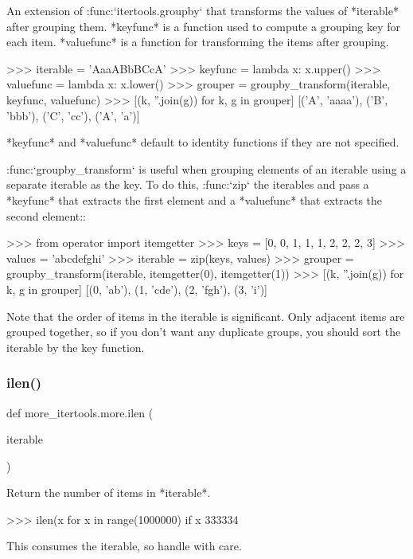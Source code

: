 \begin{DoxyVerb}An extension of :func:`itertools.groupby` that transforms the values of
*iterable* after grouping them.
*keyfunc* is a function used to compute a grouping key for each item.
*valuefunc* is a function for transforming the items after grouping.

    >>> iterable = 'AaaABbBCcA'
    >>> keyfunc = lambda x: x.upper()
    >>> valuefunc = lambda x: x.lower()
    >>> grouper = groupby_transform(iterable, keyfunc, valuefunc)
    >>> [(k, ''.join(g)) for k, g in grouper]
    [('A', 'aaaa'), ('B', 'bbb'), ('C', 'cc'), ('A', 'a')]

*keyfunc* and *valuefunc* default to identity functions if they are not
specified.

:func:`groupby_transform` is useful when grouping elements of an iterable
using a separate iterable as the key. To do this, :func:`zip` the iterables
and pass a *keyfunc* that extracts the first element and a *valuefunc*
that extracts the second element::

    >>> from operator import itemgetter
    >>> keys = [0, 0, 1, 1, 1, 2, 2, 2, 3]
    >>> values = 'abcdefghi'
    >>> iterable = zip(keys, values)
    >>> grouper = groupby_transform(iterable, itemgetter(0), itemgetter(1))
    >>> [(k, ''.join(g)) for k, g in grouper]
    [(0, 'ab'), (1, 'cde'), (2, 'fgh'), (3, 'i')]

Note that the order of items in the iterable is significant.
Only adjacent items are grouped together, so if you don't want any
duplicate groups, you should sort the iterable by the key function.\end{DoxyVerb}
 \mbox{\label{namespacemore__itertools_1_1more_a207b63f7eabe26b6bbcfb8d5906c99b6}} 
\subsubsection{\texorpdfstring{ilen()}{ilen()}}
{\footnotesize\ttfamily def more\+\_\+itertools.\+more.\+ilen (\begin{DoxyParamCaption}\item[{}]{iterable }\end{DoxyParamCaption})}

\begin{DoxyVerb}Return the number of items in *iterable*.

    >>> ilen(x for x in range(1000000) if x %
    333334

This consumes the iterable, so handle with care.\end{DoxyVerb}
 \mbox{\label{namespacemore__itertools_1_1more_abd98071367f1d445e6fdc1237a76562d}} 
